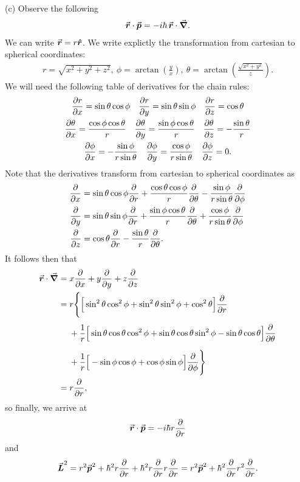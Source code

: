 {(c) Observe the following
\begin{eqnarray}
    \va*{r} \cdot \va*{p} = -i \hbar \, \va*{r} \cdot \grad
.\end{eqnarray}
We can write $\va*{r} = r \vu*{r}$.
We write explictly the transformation from cartesian to spherical coordinates:
\begin{eqnarray}
    r = \sqrt{x^2 + y^2 + z^2}, ~ \phi = \arctan(\frac{y}{x}),~ \theta = \arctan(\frac{\sqrt{x^2 + y^2}}{z})
.\end{eqnarray}
We will need the following table of derivatives for the chain rules:
\begin{gather}
    \pdv{r}{x} = \sin{\theta}\cos{\phi} \quad \pdv{r}{y} = \sin{\theta}\sin{\phi} \quad \pdv{r}{z} = \cos{\theta} \\
    \pdv{\theta}{x} = \frac{\cos{\phi}\cos{\theta}}{r} \quad \pdv{\theta}{y} = \frac{\sin{\phi}\cos{\theta}}{r} \quad \pdv{\theta}{z} = - \frac{\sin{\theta}}{r} \\
    \pdv{\phi}{x} = -\frac{\sin{\phi}}{r\sin{\theta}} \quad \pdv{\phi}{y} = \frac{\cos{\phi}}{r\sin{\theta}} \quad \pdv{\phi}{z} = 0
.\end{gather}
Note that the derivatives transform from cartesian to spherical coordinates as
\begin{align}
    \pdv{x} &= \sin{\theta}\cos{\phi} \pdv{r} + \frac{\cos{\theta}\cos{\phi}}{r} \pdv{\theta} - \frac{\sin{\phi}}{r\sin{\theta}} \pdv{\phi} \\
    \pdv{y} &= \sin{\theta}\sin{\phi} \pdv{r} + \frac{\sin{\phi}\cos{\theta}}{r} \pdv{\theta} + \frac{\cos{\phi}}{r\sin{\theta}} \pdv{\phi} \\
    \pdv{z} &= \cos{\theta} \pdv{r} - \frac{\sin{\theta}}{r} \pdv{\theta}
.\end{align}
It follows then that
\begin{eqnarray}
\begin{aligned} 
    \va*{r} \cdot \grad &= x \pdv{x} + y \pdv{y} + z \pdv{z} \\
                        &= r \Bigg\{ \Big[ \sin^2{\theta} \cos^2{\phi} + \sin^2{\theta} \sin^2{\phi} + \cos^2{\theta} \Big] \pdv{r} \\
                        &\phantom{r\Bigg\{}+ \frac{1}{r}\Big[ \sin{\theta}\cos{\theta}\cos^2{\phi} + \sin{\theta}\cos{\theta} \sin^2{\phi} - \sin{\theta}\cos{\theta} \Big] \pdv{\theta} \\
                        &\phantom{r\Bigg\{}+ \frac{1}{r} \Big[ -\sin{\phi}\cos{\phi} + \cos{\phi}\sin{\phi} \Big] \pdv{\phi} \Bigg\} \\
                        &= r \pdv{r}
,\end{aligned}
\end{eqnarray}
so finally, we arrive at
\begin{eqnarray}
    \va*{r} \cdot \va*{p} = -i \hbar r \pdv{r}
\end{eqnarray}
and
\begin{eqnarray}
    \va*{L}^2 = r^2 \va*{p}^2 + \hbar^2 r \pdv{r} + \hbar^2 r \pdv{r} r \pdv{r} = r^2 \va*{p}^2 + \hbar^2 \pdv{r} r^2 \pdv{r}
.\end{eqnarray}

}





